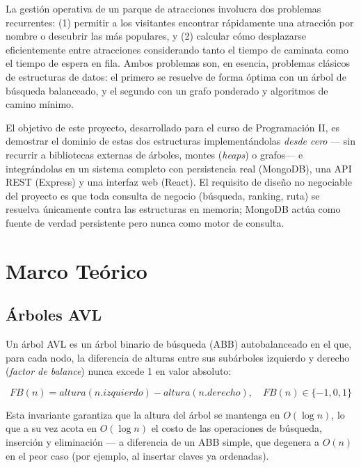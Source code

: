 \documentclass[conference]{IEEEtran}
\begin{document}
La gesti\'on operativa de un parque de atracciones involucra dos problemas
recurrentes: (1) permitir a los visitantes encontrar r\'apidamente una
atracci\'on por nombre o descubrir las m\'as populares, y (2) calcular c\'omo
desplazarse eficientemente entre atracciones considerando tanto el tiempo de
caminata como el tiempo de espera en fila. Ambos problemas son, en esencia,
problemas cl\'asicos de estructuras de datos: el primero se resuelve de forma
\'optima con un \'arbol de b\'usqueda balanceado, y el segundo con un grafo
ponderado y algoritmos de camino m\'inimo.

El objetivo de este proyecto, desarrollado para el curso de Programaci\'on II,
es demostrar el dominio de estas dos estructuras implement\'andolas
\emph{desde cero} --- sin recurrir a bibliotecas externas de \'arboles, montes
(\emph{heaps}) o grafos--- e integr\'andolas en un sistema completo con
persistencia real (MongoDB), una API REST (Express) y una interfaz web
(React). El requisito de dise\~no no negociable del proyecto es que toda
consulta de negocio (b\'usqueda, ranking, ruta) se resuelva \'unicamente contra
las estructuras en memoria; MongoDB act\'ua como fuente de verdad persistente
pero nunca como motor de consulta.

\section{Marco Te\'orico}

\subsection{\'Arboles AVL}

Un \'arbol AVL \cite{adelson1962} es un \'arbol binario de b\'usqueda (ABB)
autobalanceado en el que, para cada nodo, la diferencia de alturas entre sus
subárboles izquierdo y derecho (\emph{factor de balance}) nunca excede 1 en
valor absoluto:

\begin{equation}
FB(n) = altura(n.izquierdo) - altura(n.derecho), \quad FB(n) \in \{-1,0,1\}
\end{equation}

Esta invariante garantiza que la altura del \'arbol se mantenga en
$O(\log n)$, lo que a su vez acota en $O(\log n)$ el costo de las operaciones
de b\'usqueda, inserci\'on y eliminaci\'on --- a diferencia de un ABB simple,
que degenera a $O(n)$ en el peor caso (por ejemplo, al insertar claves ya
ordenadas).
\end{document}
